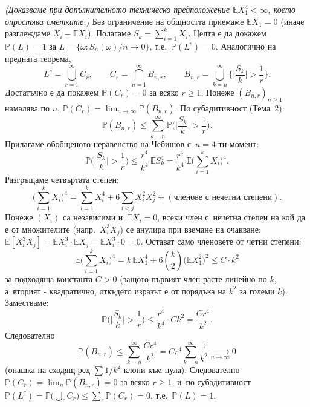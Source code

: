 \begin{proofbox}
\emph{(Доказваме при допълнителното техническо предположение
$\mathbb EX_1^4<\infty$, което опростява сметките.)} Без ограничение
на общността приемаме $\mathbb EX_1=0$ (иначе разглеждаме
$X_i-\mathbb EX_i$). Полагаме $S_k=\sum_{i=1}^k X_i$. Целта е да
докажем $\mathbb P(L)=1$ за $L=\{\omega: S_n(\omega)/n\to0\}$, т.е.\
$\mathbb P(L^c)=0$. Аналогично на предната теорема,
\[
  L^c = \bigcup_{r=1}^{\infty} C_r, \qquad C_r = \bigcap_{n=1}^{\infty}B_{n,r}, \qquad B_{n,r} = \bigcup_{k=n}^{\infty}\Big\{\Big|\frac{S_k}{k}\Big|>\frac1r\Big\}.
\]
Достатъчно е да покажем $\mathbb P(C_r)=0$ за всяко $r\ge1$. Понеже
$(B_{n,r})_{n\ge1}$ намалява по $n$, $\mathbb P(C_r)=\lim_{n\to
\infty}\mathbb P(B_{n,r})$. По субадитивност (Тема~2):
\[
  \mathbb P(B_{n,r}) \le \sum_{k=n}^{\infty} \mathbb P\Big(\Big|\frac{S_k}{k}\Big|>\frac1r\Big).
\]
Прилагаме обобщеното неравенство на Чебишов с~$n=4$-ти момент:
\[
  \mathbb P\Big(\Big|\frac{S_k}{k}\Big|>\frac1r\Big) \le \frac{r^4}{k^4}\,\mathbb E S_k^4 = \frac{r^4}{k^4}\,\mathbb E\Big(\sum_{i=1}^k X_i\Big)^4.
\]
Разгръщаме четвъртата степен:
\[
  \Big(\sum_{i=1}^k X_i\Big)^4 = \sum_{i=1}^k X_i^4 + 6\sum_{i<j} X_i^2X_j^2 + (\text{членове с~нечетни степени}).
\]
Понеже $(X_i)$ са независими и~$\mathbb EX_i=0$, всеки член с~нечетна степен на кой да е от множителите (напр.\ $X_i^3X_j$) се
анулира при вземане на очакване: $\mathbb E[X_i^3X_j]=\mathbb
EX_i^3\cdot\mathbb EX_j = \mathbb EX_i^3\cdot0=0$. Остават само
членовете от четни степени:
\[
  \mathbb E\Big(\sum_{i=1}^k X_i\Big)^4 = k\,\mathbb EX_1^4 + 6\binom{k}{2}\big(\mathbb EX_1^2\big)^2 \le C\cdot k^2
\]
за подходяща константа $C>0$ (защото първият член расте линейно по
$k$, а~вторият - квадратично, откъдето изразът е от порядъка на
$k^2$ за големи $k$). Заместваме:
\[
  \mathbb P\Big(\Big|\frac{S_k}{k}\Big|>\frac1r\Big) \le \frac{r^4}{k^4}\cdot C k^2 = \frac{Cr^4}{k^2}.
\]
Следователно
\[
  \mathbb P(B_{n,r}) \le \sum_{k=n}^{\infty}\frac{Cr^4}{k^2} = Cr^4\sum_{k=n}^{\infty}\frac1{k^2} \xrightarrow[n\to\infty]{} 0
\]
(опашка на сходящ ред $\sum 1/k^2$ клони към нула). Следователно
$\mathbb P(C_r) = \lim_n\mathbb P(B_{n,r}) = 0$ за всяко $r\ge1$, и~по
субадитивност $\mathbb P(L^c) = \mathbb P\big(\bigcup_r C_r\big) \le
\sum_r \mathbb P(C_r) = 0$, т.е.\ $\mathbb P(L)=1$. \qedbg
\end{proofbox}

